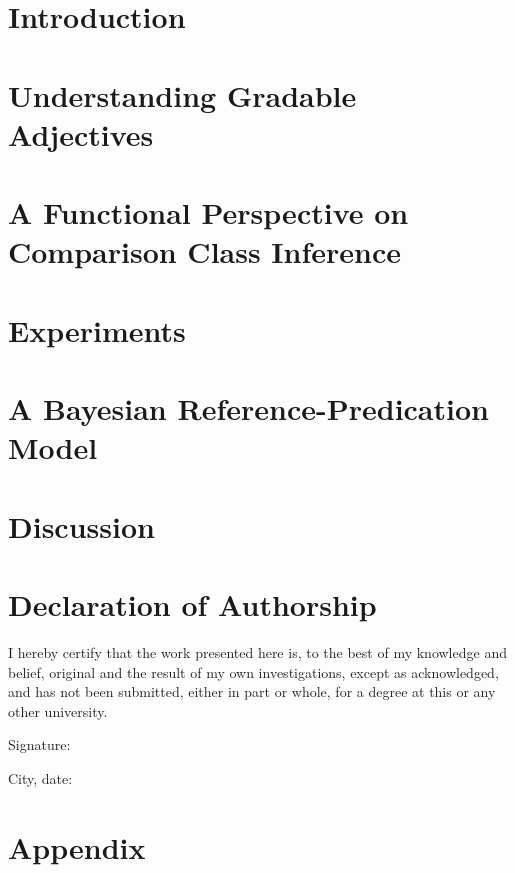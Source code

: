 \documentclass[12pt]{report}
\begin{document}
\tableofcontents

\chapter{Introduction}
\label{chapter01}


\chapter{Understanding Gradable Adjectives}
\label{chapter02}


\chapter{A Functional Perspective on Comparison Class Inference}
\label{chapter03}


\chapter{Experiments}
\label{chapter04}


\chapter{A Bayesian Reference-Predication Model}
\label{chapter05}


\chapter{Discussion}
\label{chapter06}


\chapter*{Declaration of Authorship}
I hereby certify that the work presented here is, to the best of my knowledge and belief, original and the result of my own investigations, except as acknowledged, and has not been submitted, either in part or whole, for a degree at this or any other university.

\vspace{2cm}
Signature:~\makebox[3in]{\hrulefill}

\vspace{1cm}
City, date:~\makebox[3in]{\hrulefill} 

\appendix
\chapter{Appendix}	
\label{appendix}


\printbibliography
%
\end{document}

